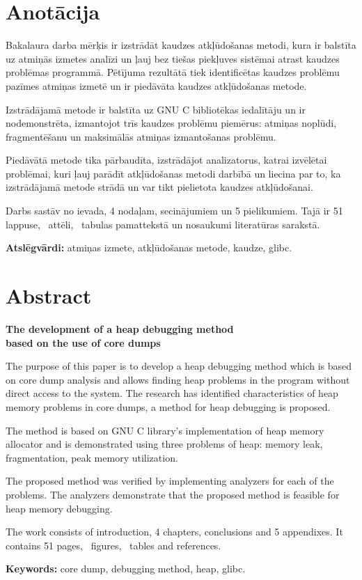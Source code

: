 \chapter*{Anotācija}
\thispagestyle{empty}

Bakalaura darba mērķis ir izstrādāt kaudzes atkļūdošanas metodi, kura ir balstīta uz atmiņās izmetes analīzi un ļauj bez tiešas piekļuves sistēmai atrast kaudzes problēmas programmā.
Pētījuma rezultātā tiek identificētas kaudzes problēmu pazīmes atmiņas izmetē un ir piedāvāta kaudzes atkļūdošanas metode.

Izstrādājamā metode ir balstīta uz GNU C bibliotēkas iedalītāju un ir nodemonstrēta, izmantojot trīs kaudzes problēmu piemērus: atmiņas noplūdi, fragmentēšanu un maksimālās atmiņas izmantošanas problēmu.


Piedāvātā metode tika pārbaudīta, izstrādājot analizatorus, katrai izvēlētai problēmai, kuri ļauj parādīt atkļūdošanas metodi darbībā un liecina par to, ka izstrādājamā metode strādā un var tikt pielietota kaudzes atkļūdošanai.

Darbs sastāv no ievada, 4 nodaļam, secinājumiem un 5 pielikumiem. Tajā ir 51 lappuse, \totfig\ attēli, \tottab\ tabulas pamattekstā un  nosaukumi literatūras sarakstā.

\textbf{Atslēgvārdi:} atmiņas izmete, atkļūdošanas metode, kaudze, glibc.

\newpage

\chapter*{Abstract}
\begin{center}
\linespread{1.2}
\vspace{-0.3cm}
\large \textbf {The development of a heap debugging method \protect\\  based on the use of core dumps}
\end{center}

The purpose of this paper is to develop a heap debugging method which is based on core dump analysis and allows finding heap problems in the program without direct access to the system.
The research has identified characteristics of heap memory problems in core dumps, a method for heap debugging is proposed.

The method is based on GNU C library's implementation of heap memory allocator and is demonstrated using three problems of heap: memory leak, fragmentation, peak memory utilization.

The proposed method was verified by implementing analyzers for each of the problems.
The analyzers demonstrate that the proposed method is feasible for heap memory debugging.


\thispagestyle{empty}
	The work consists of introduction, 4 chapters, conclusions and 5 appendixes. It contains 51 pages, \totfig\ figures, \tottab\ tables and  references.

\textbf{Keywords:} core dump, debugging method, heap, glibc.


\newpage 






